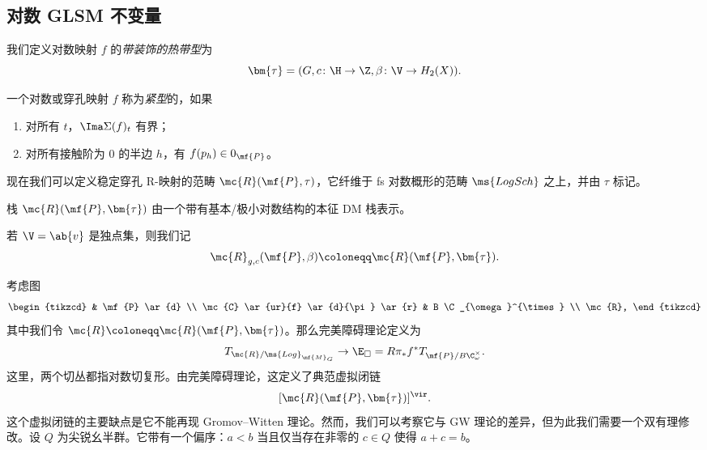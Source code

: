 \subsection{对数 GLSM 不变量}%
\label{sub:Log GLSM invariants}

\begin{defn}
    我们定义对数映射 \(f\) 的\textit{带装饰的热带型}为
    \[ \bm{\tau} = (G, c \colon \H \to \Z, \beta \colon \V \to H_2(X)). \]
\end{defn}

\begin{defn}
    一个对数或穿孔映射 \(f\) 称为\textit{紧型}的，如果
    \begin{enumerate}
        \item 对所有 \(t\)，\(\Ima \Sigma(f)_t\) 有界；
        \item 对所有接触阶为 \(0\) 的半边 \(h\)，有 \(f(p_h) \in 0_{\mf{P}}\)。
    \end{enumerate}
\end{defn}

现在我们可以定义稳定穿孔 R-映射的范畴 \(\mc{R}(\mf{P}, \tau)\)，它纤维于 fs 对数概形的范畴 \(\ms{LogSch}\) 之上，并由 \(\tau\) 标记。

\begin{thm}
    栈 \(\mc{R}(\mf{P},\bm{\tau})\) 由一个带有基本/极小对数结构的本征 DM 栈表示。
\end{thm}

\begin{rmk}
    若 \(\V = \ab\{v\}\) 是独点集，则我们记
    \[ \mc{R}_{g, c}(\mf{P}, \beta) \coloneqq \mc{R}(\mf{P}, \bm{\tau}). \]
\end{rmk}

考虑图
\begin{equation*}
\begin{tikzcd}
    & \mf{P} \ar{d} \\
    \mc{C} \ar{ur}{f} \ar{d}{\pi} \ar{r} & B \C_{\omega}^{\times} \\
    \mc{R},
\end{tikzcd}
\end{equation*}
其中我们令 \(\mc{R} \coloneqq \mc{R}(\mf{P}, \bm{\tau})\)。那么完美障碍理论定义为
\[ T_{\mc{R}/\ms{Log}_{\mf{M}_G}} \to \E_{\square} = R \pi_* f^* T_{\mf{P}/B\C_{\omega}^{\times}}. \]
这里，两个切丛都指对数切复形。由完美障碍理论，这定义了典范虚拟闭链
\[ [\mc{R}(\mf{P}, \bm{\tau})]^{\vir}. \]
这个虚拟闭链的主要缺点是它不能再现 Gromov--Witten 理论。然而，我们可以考察它与 GW 理论的差异，但为此我们需要一个双有理修改。设 \(Q\) 为尖锐幺半群。它带有一个偏序：\(a < b\) 当且仅当存在非零的 \(c \in Q\) 使得 \(a+c = b\)。

